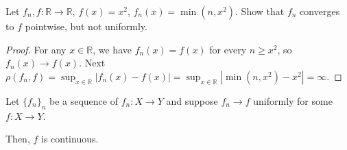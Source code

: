 \begin{ex}
    Let $f_n, f : \mathbb R \to \mathbb R$, $f(x) = x^2$, 
    $f_n(x) = \min(n, x^2)$. Show that 
    $f_n$ converges to $f$ pointwise, but not uniformly. 
\end{ex}
\begin{proof}
    For any $x \in \mathbb R$, we have $f_n(x) = f(x)$ 
    for every $n \geq x^2$, so $f_n(x) \to f(x)$. 
    Next $\rho(f_n,f) = \sup_{x\in\mathbb R} |f_n(x) - f(x)| 
    = \sup_{x\in\mathbb R} |\min(n,x^2) - x^2| = \infty$.
\end{proof}
\begin{thm}
    Let $\{f_n\}_n$ be a sequence of $f_n : X \to Y$ and suppose 
    $f_n \to f$ uniformly for some $f : X \to Y$. 

    Then, $f$ is continuous.
\end{thm}

\newpage 
